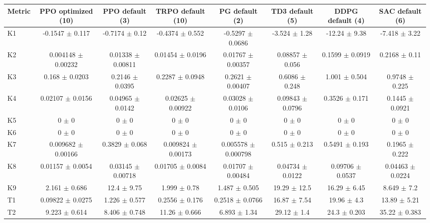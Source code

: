 \begin{tabular}{lccccccc}
\toprule
Metric & PPO optimized (10) & PPO default (3) & TRPO default (10) & PG default (2) & TD3 default (5) & DDPG default (4) & SAC default (6) \\
\midrule
K1 & -0.1547 $\pm$ 0.117 & -0.7174 $\pm$ 0.12 & -0.4374 $\pm$ 0.552 & -0.5297 $\pm$ 0.0686 & -3.524 $\pm$ 1.28 & -12.24 $\pm$ 9.38 & -7.418 $\pm$ 3.22 \\
K2 & 0.004148 $\pm$ 0.00232 & 0.01338 $\pm$ 0.00811 & 0.01454 $\pm$ 0.0196 & 0.01767 $\pm$ 0.00357 & 0.08857 $\pm$ 0.056 & 0.1599 $\pm$ 0.0919 & 0.2168 $\pm$ 0.11 \\
K3 & 0.168 $\pm$ 0.0203 & 0.2146 $\pm$ 0.0395 & 0.2287 $\pm$ 0.0948 & 0.2621 $\pm$ 0.00407 & 0.6086 $\pm$ 0.248 & 1.001 $\pm$ 0.504 & 0.9748 $\pm$ 0.225 \\
K4 & 0.02107 $\pm$ 0.0156 & 0.04965 $\pm$ 0.0142 & 0.02625 $\pm$ 0.00922 & 0.03028 $\pm$ 0.0106 & 0.09843 $\pm$ 0.0796 & 0.3526 $\pm$ 0.171 & 0.1445 $\pm$ 0.0921 \\
K5 & 0 $\pm$ 0 & 0 $\pm$ 0 & 0 $\pm$ 0 & 0 $\pm$ 0 & 0 $\pm$ 0 & 0 $\pm$ 0 & 0 $\pm$ 0 \\
K6 & 0 $\pm$ 0 & 0 $\pm$ 0 & 0 $\pm$ 0 & 0 $\pm$ 0 & 0 $\pm$ 0 & 0 $\pm$ 0 & 0 $\pm$ 0 \\
K7 & 0.009682 $\pm$ 0.00166 & 0.3829 $\pm$ 0.068 & 0.009824 $\pm$ 0.00173 & 0.005578 $\pm$ 0.000798 & 0.515 $\pm$ 0.213 & 0.5491 $\pm$ 0.193 & 0.1965 $\pm$ 0.222 \\
K8 & 0.01157 $\pm$ 0.0054 & 0.03145 $\pm$ 0.00718 & 0.01705 $\pm$ 0.0084 & 0.01707 $\pm$ 0.00484 & 0.04734 $\pm$ 0.0122 & 0.09706 $\pm$ 0.0537 & 0.04463 $\pm$ 0.0224 \\
K9 & 2.161 $\pm$ 0.686 & 12.4 $\pm$ 9.75 & 1.999 $\pm$ 0.78 & 1.487 $\pm$ 0.505 & 19.29 $\pm$ 12.5 & 16.29 $\pm$ 6.45 & 8.649 $\pm$ 7.2 \\
T1 & 0.09822 $\pm$ 0.0275 & 1.226 $\pm$ 0.577 & 0.2556 $\pm$ 0.176 & 0.2518 $\pm$ 0.0766 & 16.87 $\pm$ 7.54 & 19.96 $\pm$ 4.3 & 13.89 $\pm$ 5.21 \\
T2 & 9.223 $\pm$ 0.614 & 8.406 $\pm$ 0.748 & 11.26 $\pm$ 0.666 & 6.893 $\pm$ 1.34 & 29.12 $\pm$ 1.4 & 24.3 $\pm$ 0.203 & 35.22 $\pm$ 0.383 \\
\bottomrule
\end{tabular}
